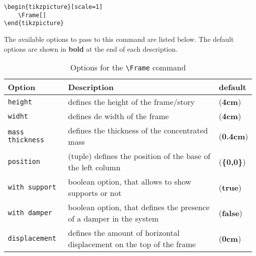 \documentclass[11pt,letterpaper,oneside]{book}
\begin{document}
\begin{lstlisting}[firstnumber=1]
\begin{tikzpicture}[scale=1]
    \Frame[]
\end{tikzpicture}
\end{lstlisting}

The available options to pass to this command are listed below. The default options are shown in \textbf{bold} at the end of each description.\par
\begin{table}[!h]
  \centering
  \caption{Options for the \texttt{\textbackslash Frame} command}
  \begin{tabular}{l p{8cm} l}\toprule
    Option & Description & default \\\midrule
    \texttt{height} & defines the height of the frame/story & (\textbf{4cm})                                      \\
    \texttt{widht}  & defines de width of the frame & (\textbf{4cm})                                              \\
    \texttt{mass thickness} & defines the thickness of the concentrated mass & (\textbf{0.4cm})                   \\
    \texttt{position} & (tuple) defines the position of the base of the left column & (\textbf{\{0,0\}})          \\
    \texttt{with support} & boolean option, that allows to show supports or not & (\textbf{true})                 \\
    \texttt{with damper} & boolean option, that defines the presence of a damper in the system & (\textbf{false}) \\
    \texttt{displacement} & defines the amount of horizontal displacement on the top of the frame & (\textbf{0cm})\\\bottomrule
  \end{tabular}
  \label{tab:frameOptions}
\end{table}

\begin{figure}[!ht]
  \centering
  \subfloat[  ]{%
    \begin{tikzpicture}[scale=0.6]
      \Frame[position = {0cm,0em}, height = 6cm]
      \Frame[position = {0cm,6cm},height = 4cm, with support = false]
      \Frame[position = {0cm,10cm},height = 4cm, with support = false]
    \end{tikzpicture}
  }
  \qquad
  \subfloat[  ]{%
    \begin{tikzpicture}[scale=0.6]
      \Frame[position = {0em,0em}, displacement = 0.15cm]
      \Frame[position = {0.15cm,4cm}, with support = false, displacement = 1.35cm]
      \Frame[position = {1.5cm,8cm}, with support = false, displacement = 3.4cm]
    \end{tikzpicture}
  }

  \label{fig:rigi1}
\end{figure}
\end{document}
